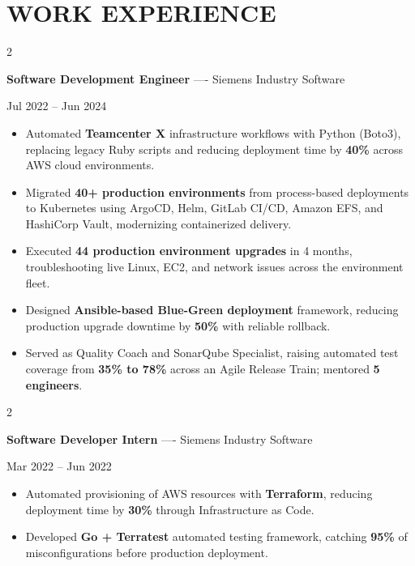\documentclass[10pt, letterpaper]{article}
\newenvironment{highlights}{
    \begin{itemize}[
        topsep=0.10 cm,
        parsep=0.06 cm,
        partopsep=0pt,
        itemsep=0.06 cm,
        leftmargin=12pt
    ]
}{
    \end{itemize}
}
\newenvironment{twocolentry}[2][]{
    \onecolentry
    \def\secondColumn{#2}
    \setcolumnwidth{\fill, 4.5 cm}
    \begin{paracol}{2}
}{
    \switchcolumn \raggedleft \secondColumn
    \end{paracol}
    \endonecolentry
}
\begin{document}
\section{WORK EXPERIENCE}
\begin{twocolentry}{Jul 2022 -- Jun 2024}
\textbf{Software Development Engineer} ---- Siemens Industry Software
\end{twocolentry}
\begin{highlights}
  \item Automated \textbf{Teamcenter X} infrastructure workflows with Python (Boto3), replacing legacy Ruby scripts and reducing deployment time by \textbf{40\%} across AWS cloud environments.
  \item Migrated \textbf{40+ production environments} from process-based deployments to Kubernetes using ArgoCD, Helm, GitLab CI/CD, Amazon EFS, and HashiCorp Vault, modernizing containerized delivery.
  \item Executed \textbf{44 production environment upgrades} in 4 months, troubleshooting live Linux, EC2, and network issues across the environment fleet.
  \item Designed \textbf{Ansible-based Blue-Green deployment} framework, reducing production upgrade downtime by \textbf{50\%} with reliable rollback.
  \item Served as Quality Coach and SonarQube Specialist, raising automated test coverage from \textbf{35\% to 78\%} across an Agile Release Train; mentored \textbf{5 engineers}.
\end{highlights}

\vspace{0.15 cm}

\begin{twocolentry}{Mar 2022 -- Jun 2022}
\textbf{Software Developer Intern} ---- Siemens Industry Software
\end{twocolentry}
\begin{highlights}
  \item Automated provisioning of AWS resources with \textbf{Terraform}, reducing deployment time by \textbf{30\%} through Infrastructure as Code.
  \item Developed \textbf{Go + Terratest} automated testing framework, catching \textbf{95\%} of misconfigurations before production deployment.
\end{highlights}

\vspace{0.15 cm}
\end{document}
